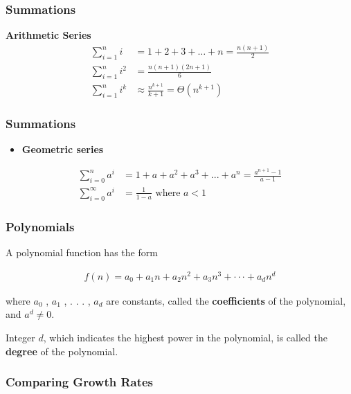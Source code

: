 \documentclass[11pt]{article}
\providecommand{\tightlist}{%
      \setlength{\itemsep}{0pt}\setlength{\parskip}{0pt}}
\begin{document}
    \hypertarget{summations}{%
\subsubsection{Summations}\label{summations}}

\textbf{Arithmetic Series} \begin{align*}
        \sum_{i = 1}^{n} i &= 1+2+3+ \ldots + n = \frac{n(n+1)}{2} \\
        \sum_{i = 1}^{n} i^2 &= \frac{n(n+1)(2n+1)}{6} \\
        \sum_{i = 1}^{n} i^k &\approx \frac{n^{k + 1}}{k + 1} = \Theta(n^{k + 1})
    \end{align*}

    \hypertarget{summations}{%
\subsubsection{Summations}\label{summations}}

\begin{itemize}
\tightlist
\item
  \textbf{Geometric series}
\end{itemize}

\begin{align*}
        \sum_{i = 0}^{n} a^i &= 1 + a + a^2+a^3+ ... +a^n= \frac{a^{n + 1} - 1}{a - 1} \\
        \sum_{i = 0}^{\infty} a^i &= \frac{1}{1 - a} \text{ where } a < 1
    \end{align*}

    \hypertarget{polynomials}{%
\subsubsection{Polynomials}\label{polynomials}}

A polynomial function has the form

\begin{align*}
f(n) = a_0 +a_1n+a_2n^2 +a_3n^3 +···+a_dn^d 
\end{align*}

where \(a_0\) , \(a_1\) , . . . , \(a_d\) are constants, called the
\textbf{coefficients} of the polynomial, and \(a^d\neq0\).

Integer \(d\), which indicates the highest power in the polynomial, is
called the \textbf{degree} of the polynomial.

    \hypertarget{comparing-growth-rates}{%
\subsubsection{Comparing Growth Rates}\label{comparing-growth-rates}}
\end{document}
